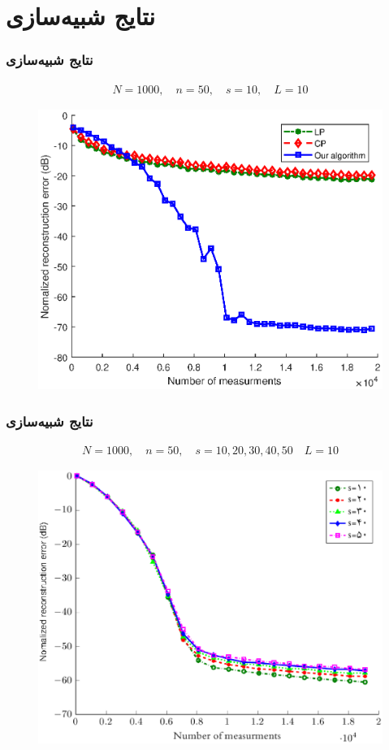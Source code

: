 \section{نتایج شبیه‌سازی\hfill}

\begin{frame}
\frametitle{نتایج شبیه‌سازی}
\begin{align*}
N= 1000, \quad n= 50, \quad s= 10, \quad L=10
\end{align*}
\begin{figure}
	\centering
	\includegraphics[scale=0.45]{Images/simfig1.eps}
\end{figure}
\end{frame}
\begin{frame}
\frametitle{نتایج شبیه‌سازی}
\begin{align*}
N= 1000, \quad n= 50, \quad s= 10,20,30,40,50 \quad L=10
\end{align*}
\begin{figure}
	\centering
	\includegraphics[scale=0.25]{Images/simfig2.eps}
\end{figure}
\end{frame}
